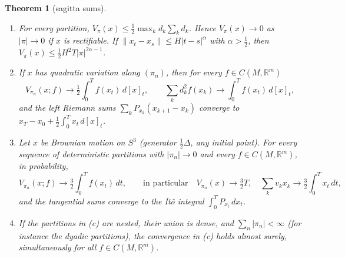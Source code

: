 \documentclass[11pt,reqno]{amsart}
\newtheorem{theorem}{Theorem}[section]
\theoremstyle{definition}
\theoremstyle{remark}
\numberwithin{equation}{section}
\newcommand{\R}{\mathbb{R}}
\begin{document}
\begin{theorem}[sagitta sums]\label{thm:sagitta}
\begin{enumerate}[label=(\alph*)]
\item For every partition, $V_\pi(x)\le\tfrac12\max_kd_k\sum_kd_k$.  Hence $V_\pi(x)\to0$ as
$\lvert\pi\rvert\to0$ if $x$ is rectifiable.  If $\lVert x_t-x_s\rVert\le H\lvert t-s\rvert^\alpha$ with
$\alpha>\tfrac12$, then $V_\pi(x)\le\tfrac12H^2T\lvert\pi\rvert^{2\alpha-1}$.
\item If $x$ has quadratic variation along $(\pi_n)$, then for every $f\in C(M,\R^m)$
\[
V_{\pi_n}(x;f)\to\tfrac12\int_0^Tf(x_t)\,d[x]_t,\qquad \sum_kd_k^2f(x_k)\to\int_0^Tf(x_t)\,d[x]_t,
\]
and the left Riemann sums $\sum_kP_{x_k}(x_{k+1}-x_k)$ converge to $x_T-x_0+\tfrac12\int_0^Tx_t\,d[x]_t$.
\item Let $x$ be Brownian motion on $S^3$ (generator $\tfrac12\Delta$, any initial point).  For every sequence of
deterministic partitions with $\lvert\pi_n\rvert\to0$ and every $f\in C(M,\R^m)$, in probability,
\[
V_{\pi_n}(x;f)\to\tfrac32\int_0^Tf(x_t)\,dt,\qquad\text{in particular}\quad V_{\pi_n}(x)\to\tfrac32T,\quad
\sum_kv_kx_k\to\tfrac32\int_0^Tx_t\,dt,
\]
and the tangential sums converge to the It\^o integral $\int_0^TP_{x_t}\,dx_t$.
\item If the partitions in (c) are nested, their union is dense, and $\sum_n\lvert\pi_n\rvert<\infty$ (for instance the
dyadic partitions), the convergence in (c) holds almost surely, simultaneously for all $f\in C(M,\R^m)$.
\end{enumerate}
\end{theorem}
\end{document}
